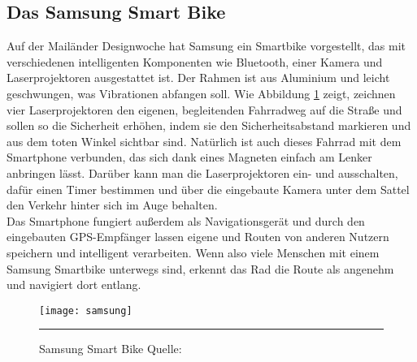 \subsection{Das Samsung Smart Bike}
Auf der Mailänder Designwoche hat Samsung ein Smartbike vorgestellt, das mit verschiedenen intelligenten Komponenten wie Bluetooth, einer Kamera und Laserprojektoren ausgestattet ist. Der Rahmen ist aus Aluminium und leicht geschwungen, was Vibrationen abfangen soll. Wie Abbildung \ref{fig:samsung} zeigt, zeichnen vier Laserprojektoren den eigenen, begleitenden Fahrradweg auf die Straße und sollen so die Sicherheit erhöhen, indem sie den Sicherheitsabstand markieren und aus dem toten Winkel sichtbar sind. Natürlich ist auch dieses Fahrrad mit dem \gls{Smartphone} verbunden, das sich dank eines Magneten einfach am Lenker anbringen lässt. Darüber kann man die Laserprojektoren ein- und ausschalten, dafür einen Timer bestimmen und über die eingebaute Kamera unter dem Sattel den Verkehr hinter sich im Auge behalten. \\
Das \gls{Smartphone} fungiert außerdem als Navigationsgerät und durch den eingebauten \gls{GPS}-Empfänger lassen eigene und Routen von anderen Nutzern speichern und intelligent verarbeiten\cite{smartbike}. Wenn also viele Menschen mit einem Samsung Smartbike unterwegs sind, erkennt das Rad die Route als angenehm und navigiert dort entlang. 
\begin{figure}[H]
    \centering
    \texttt{[image: samsung]}
    \rule{35em}{0.5pt}
    \caption[Samsung Smart Bike]{Samsung Smart Bike  Quelle: \cite{smartbike}} 
    \label{fig:samsung}
\end{figure}
